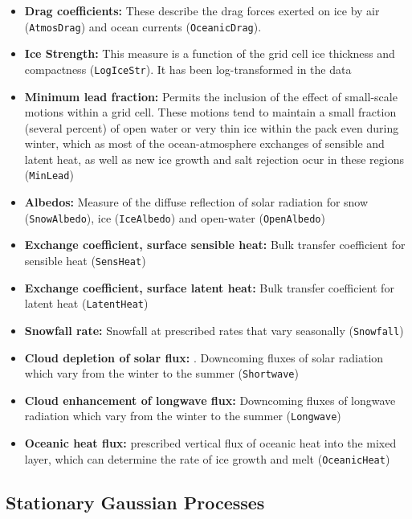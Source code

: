 \documentclass{article}\usepackage[]{graphicx}\usepackage[]{color}
\begin{document}
\begin{itemize}

\item \textbf{Drag coefficients:} These describe the drag forces exerted on ice by air (\texttt{AtmosDrag}) and ocean currents (\texttt{OceanicDrag}). 
\item \textbf{Ice Strength:} This measure is a function of the grid cell ice thickness and compactness (\texttt{LogIceStr}). It has been log-transformed in the data
\item \textbf{Minimum lead fraction:} Permits the inclusion of the effect of small-scale motions within a grid cell. These motions tend to maintain a small fraction (several percent) of open water or very thin ice within the pack even during winter, which as most of the ocean-atmosphere exchanges of sensible and latent heat, as well as new ice growth and salt rejection ocur in these regions (\texttt{MinLead})
\item \textbf{Albedos:} Measure of the diffuse reflection of solar radiation for snow (\texttt{SnowAlbedo}), ice (\texttt{IceAlbedo}) and open-water (\texttt{OpenAlbedo})
\item \textbf{Exchange coeﬀicient, surface sensible heat:}  Bulk transfer coefficient for sensible heat (\texttt{SensHeat})
\item \textbf{Exchange coeﬀicient, surface latent heat:}  Bulk transfer coefficient for latent heat (\texttt{LatentHeat})
\item \textbf{Snowfall rate:} Snowfall at prescribed rates that vary seasonally (\texttt{Snowfall})
\item \textbf{Cloud depletion of solar flux:} . Downcoming fluxes of solar radiation which vary from the winter to the summer (\texttt{Shortwave})
\item \textbf{Cloud enhancement of longwave flux:} Downcoming fluxes of longwave radiation which vary from the winter to the summer (\texttt{Longwave})
\item \textbf{Oceanic heat flux:} prescribed vertical flux of oceanic heat into the mixed layer, which can determine the rate of ice growth and melt (\texttt{OceanicHeat})



\end{itemize}

\subsection*{Stationary Gaussian Processes}
\end{document}
